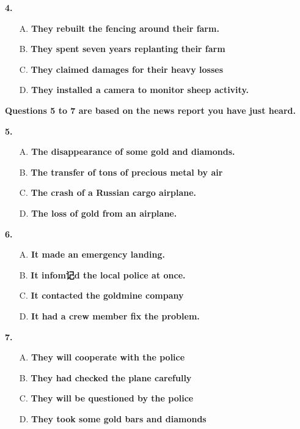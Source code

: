 \documentclass[UTF8,11pt]{ctexart}
\begin{document}
\textbf{4.}


\begin{itemize}[leftmargin=2em,itemsep=.2em,topsep=.4em]\item[A.] \textbf{They rebuilt the fencing around their farm.}
\item[B.] \textbf{They spent seven years replanting their farm}
\item[C.] \textbf{They claimed damages for their heavy losses}
\item[D.] \textbf{They installed a camera to monitor sheep activity.}
\end{itemize}

\textbf{Questions 5 to 7 are based on the news report you have just heard.}


\textbf{5.}


\begin{itemize}[leftmargin=2em,itemsep=.2em,topsep=.4em]\item[A.] \textbf{The disappearance of some gold and diamonds.}
\item[B.] \textbf{The transfer of tons of precious metal by air}
\item[C.] \textbf{The crash of a Russian cargo airplane.}
\item[D.] \textbf{The loss of gold from an airplane.}
\end{itemize}

\textbf{6.}


\begin{itemize}[leftmargin=2em,itemsep=.2em,topsep=.4em]\item[A.] \textbf{It made an emergency landing.}
\item[B.] \textbf{It infom记d the local police at once.}
\item[C.] \textbf{It contacted the goldmine company}
\item[D.] \textbf{It had a crew member fix the problem.}
\end{itemize}

\textbf{7.}


\begin{itemize}[leftmargin=2em,itemsep=.2em,topsep=.4em]\item[A.] \textbf{They will cooperate with the police}
\item[B.] \textbf{They had checked the plane carefully}
\item[C.] \textbf{They will be questioned by the police}
\item[D.] \textbf{They took some gold bars and diamonds}
\end{itemize}
\end{document}
